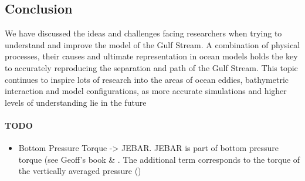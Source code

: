 \documentclass[..\EOYR.tex]{subfiles}
\begin{document}
\subsection{Conclusion}

We have discussed the ideas and challenges facing researchers when trying to understand and improve the model of the Gulf Stream. A combination of physical processes, their causes and ultimate representation in ocean models holds the key to accurately reproducing the separation and path of the Gulf Stream. This topic continues to inspire lots of research into the areas of ocean eddies, bathymetric interaction and model configurations, as more accurate simulations and higher levels of understanding lie in the future


\paragraph{TODO}
\begin{itemize}
    \item Bottom Pressure Torque -> JEBAR. JEBAR is part of bottom pressure torque (see Geoff's book \& \citep{Greatbatch1991}. The additional term corresponds to the torque of the vertically averaged pressure (\citep{Greatbatch1991})
\end {itemize}
\end{document}

